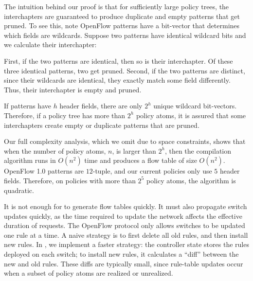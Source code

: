 The intuition behind our proof is that for sufficiently large policy trees,
the interchapters are guaranteed to produce
duplicate and empty patterns that get pruned. To see this,
note OpenFlow patterns have a bit-vector that determines which fields
are wildcards.  Suppose two patterns have identical wildcard bits and
we calculate their interchapter:

First, if the two patterns are identical, then so is their
  interchapter. Of these three identical patterns, two get pruned.
Second, if the two patterns are distinct, since their wildcards are
  identical, they exactly match some field differently. Thus, their
  interchapter is empty and pruned.

If patterns have $h$ header fields, there are only $2^h$ unique
wildcard bit-vectors. Therefore, if a policy tree has more than $2^h$
policy atoms, it is assured that some interchapters create empty or duplicate
patterns that are pruned.

Our full complexity analysis, which we omit due to space constraints, shows that when the
number of policy atoms, $n$, is larger than $2^h$, then the
compilation algorithm runs in $O(n^2)$ time and produces a flow table
of size $O(n^2)$. OpenFlow 1.0 patterns are $12$-tuple, and our current
policies
only use $5$ header fields. Therefore, on policies
with more than $2^5$ policy atoms, the algorithm is quadratic.


It is not enough for \sys to generate flow tables quickly. It must
also propagate switch updates quickly, as the time required to update
the network affects the effective duration of requests.
The OpenFlow protocol only allows switches to be updated one rule at a
time.  A naive strategy is to first delete all old rules, and then
install new rules. In \sys, we implement a faster strategy: the
controller state stores the rules deployed on each switch; to install
new rules, it calculates a ``diff'' between the new and old
rules. These diffs are typically small, since rule-table updates occur
when a subset of policy atoms are realized or unrealized.


